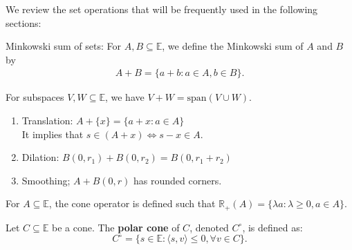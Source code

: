 \documentclass{tufte-handout}
\begin{document}
We review the set operations that will be frequently used in the following sections:
\begin{Definition}
    Minkowski sum of sets: For \( A, B \subseteq \mathbb{E} \), we define the Minkowski sum of \( A \) and \( B \) by
    \begin{align}
    A + B = \{ a + b : a \in A, b \in B \}.
    \end{align}
\end{Definition}
\begin{Proposition}
    For subspaces \( V, W \subseteq \mathbb{E} \), we have \( V + W = \text{span}(V \cup W) \).
\end{Proposition}
\begin{Example}
    \vspace{-1em}
    \begin{enumerate}
        \item Translation: \( A + \{x\} = \{a + x : a \in A\} \)\\
        It implies that \(s \in (A + x) \iff s - x \in A\).
        \item Dilation: \(B(0, r_1) + B(0, r_2) = B(0, r_1+r_2)\)
        \item Smoothing; \( A + B(0, r) \) has rounded corners.
    \end{enumerate}
\end{Example}
\begin{Definition}
        For \( A \subseteq \mathbb{E} \),
        the cone operator is defined such that 
        \( \mathbb{R}_+ (A)= \{ \lambda a : \lambda \geq 0, a \in A \} \).
\end{Definition}

\begin{Definition}
    Let $C \subseteq \mathbb{E}$ be a cone. The \textbf{polar cone} of $C$, denoted $C^\circ$, is defined as:
    \begin{equation}
        C^\circ = \{ s \in \mathbb{E} : \langle s, v \rangle \le 0, \forall v \in C \}.
    \end{equation}
\end{Definition}
\end{document}
